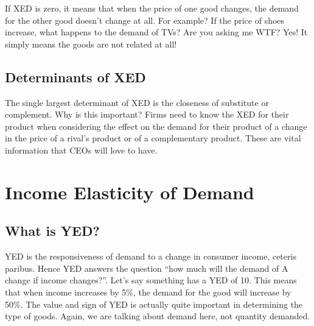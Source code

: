 \documentclass[DIV=classic,11pt,numbers=noenddot,listof=totoc,bibliography=totoc,parskip]{scrartcl}
\begin{document}
If XED is zero, it means that when the price of one good changes, the demand for the other good doesn’t change at all. For example? If the price of shoes increase, what happens to the demand of TVs? Are you asking me WTF? Yes! It simply means the goods are not related at all!
\subsection{Determinants of XED}
The single largest determinant of XED is the closeness of substitute or complement. Why is this important? Firms need to know the XED for their product when considering the effect on the demand for their product of a change in the price of a rival’s product or of a complementary product. These are vital information that CEOs will love to have.
\newpage
\section{Income Elasticity of Demand}
\subsection{What is YED?}
YED is the responsiveness of demand to a change in consumer income, ceteris paribus. Hence YED answers the question “how much will the demand of A change if income changes?”. Let’s say something has a YED of 10. This means that when income increases by 5\%, the demand for the good will increase by 50\%. The value and sign of YED is actually quite important in determining the type of goods. Again, we are talking about demand here, not quantity demanded.
\end{document}

